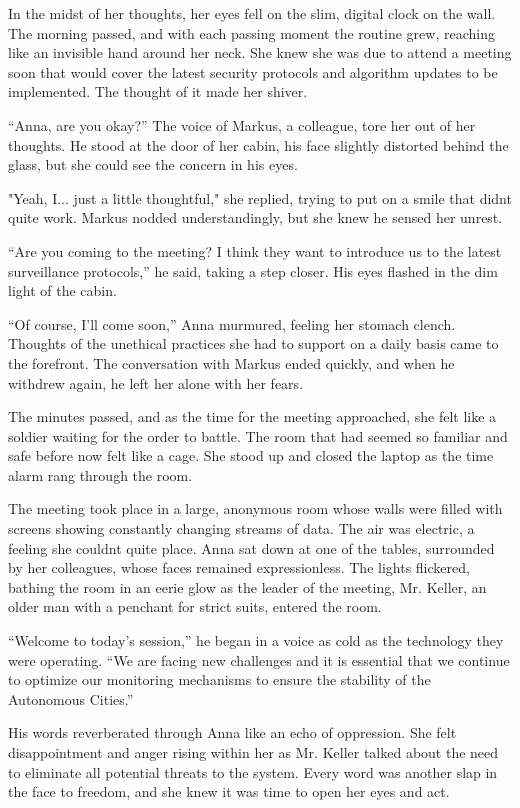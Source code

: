\documentclass[
]{article}
\begin{document}
In the midst of her thoughts, her eyes fell on the slim, digital clock
on the wall. The morning passed, and with each passing moment the
routine grew, reaching like an invisible hand around her neck. She knew
she was due to attend a meeting soon that would cover the latest
security protocols and algorithm updates to be implemented. The thought
of it made her shiver.

``Anna, are you okay?'' The voice of Markus, a colleague, tore her out
of her thoughts. He stood at the door of her cabin, his face slightly
distorted behind the glass, but she could see the concern in his eyes.

"Yeah, I... just a little thoughtful," she replied, trying to put on a
smile that didn\textquotesingle t quite work. Markus nodded
understandingly, but she knew he sensed her unrest.

``Are you coming to the meeting? I think they want to introduce us to
the latest surveillance protocols,'' he said, taking a step closer. His
eyes flashed in the dim light of the cabin.

``Of course, I'll come soon,'' Anna murmured, feeling her stomach
clench. Thoughts of the unethical practices she had to support on a
daily basis came to the forefront. The conversation with Markus ended
quickly, and when he withdrew again, he left her alone with her fears.

The minutes passed, and as the time for the meeting approached, she felt
like a soldier waiting for the order to battle. The room that had seemed
so familiar and safe before now felt like a cage. She stood up and
closed the laptop as the time alarm rang through the room.

The meeting took place in a large, anonymous room whose walls were
filled with screens showing constantly changing streams of data. The air
was electric, a feeling she couldn\textquotesingle t quite place. Anna
sat down at one of the tables, surrounded by her colleagues, whose faces
remained expressionless. The lights flickered, bathing the room in an
eerie glow as the leader of the meeting, Mr. Keller, an older man with a
penchant for strict suits, entered the room.

``Welcome to today's session,'' he began in a voice as cold as the
technology they were operating. ``We are facing new challenges and it is
essential that we continue to optimize our monitoring mechanisms to
ensure the stability of the Autonomous Cities.''

His words reverberated through Anna like an echo of oppression. She felt
disappointment and anger rising within her as Mr. Keller talked about
the need to eliminate all potential threats to the system. Every word
was another slap in the face to freedom, and she knew it was time to
open her eyes and act.
\end{document}
